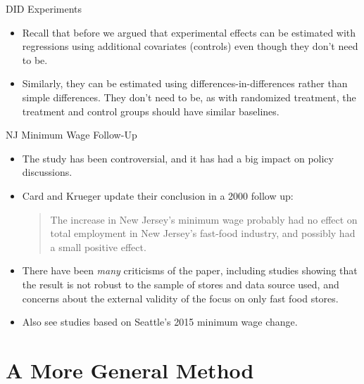 \documentclass[aspectratio=169,11pt]{beamer}
\begin{document}
\begin{frame}{DID Experiments}
\begin{itemize}
  \item Recall that before we argued that experimental
  effects can be estimated with regressions using additional
  covariates (controls) even though they don't need to be.

  \medskip
  \item Similarly, they can be estimated using differences-in-differences
  rather than simple differences. They don't need to be, as with
  randomized treatment, the treatment and control groups should have
  similar baselines.

\end{itemize}
\end{frame}

\begin{frame}{NJ Minimum Wage Follow-Up}
\begin{itemize}
  \item The study has been controversial, and it has had a
  big impact on policy discussions.

  \medskip
  \item Card and Krueger update their conclusion
  in a 2000 follow up:
  \begin{quotation}
The increase in New Jersey's minimum wage probably
had no effect on total employment in New Jersey's
fast-food industry, and possibly had a small positive
effect.
  \end{quotation}

  \smallskip
  \item There have been \emph{many} criticisms of the paper,
  including studies showing that the result is not robust to the
  sample of stores and data source used, and concerns about
  the external validity of the focus on only fast food stores.

  \smallskip
  \item Also see studies based on Seattle's 2015 minimum wage change. 
\end{itemize}
\end{frame}



\section{A More General Method}
\end{document}
